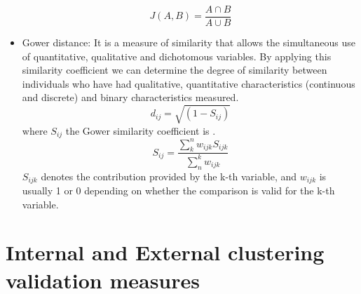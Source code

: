 \begin{itemize}
    \begin{equation}
        J(A,B) = \frac{A \cap B}{A \cup B}
    \end{equation}
    \item Gower distance: It is a measure of similarity that allows the simultaneous use of quantitative, qualitative and dichotomous variables. By applying this similarity coefficient we can determine the degree of similarity between individuals who have had qualitative, quantitative characteristics (continuous and discrete) and binary characteristics measured.
    \begin{equation}
        d_{ij}=\sqrt{(1-S_{ij})}
    \end{equation}
    where $S_{ij}$ the Gower similarity coefficient is \citep{b62}.
    \begin{equation}
        S_{ij}=\frac{\sum_{k}^{n}w_{ijk}S_{ijk}}{\sum_{n}^{k}w_{ijk}}
    \end{equation}
    $S_{ijk}$ denotes the contribution provided by the k-th variable, and $w_{ijk}$ is usually 1 or 0 depending on whether the comparison is valid for the k-th variable.
\end{itemize}

\section {Internal and External clustering validation measures} \label{sec:seccion2}

